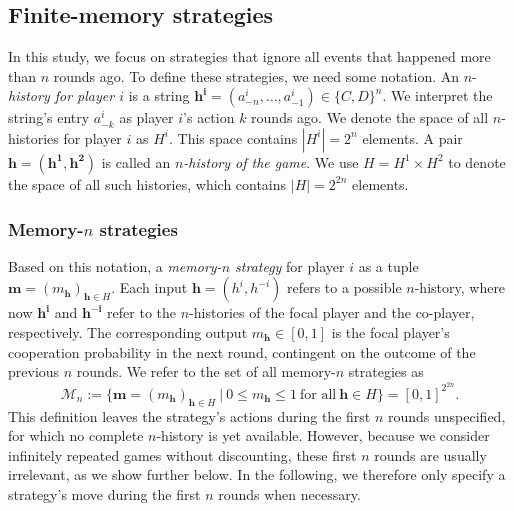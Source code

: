 \documentclass[9pt,twoside,lineno]{pnas-new}
\theoremstyle{plainCl1}
\theoremstyle{plainCl2}
\begin{document}
\subsection{Finite-memory strategies} 


In this study, we focus on strategies that ignore all events that happened more than $n$ rounds ago.
To define these strategies, we need some notation. 
An \(n\)-{\it history for player $i$} is a string \(\mathbf{h^i} \!=\! (a^i_{-n}, \ldots, a^i_{-1})\! \in \!\{C, D\}^n\). 
We interpret the string's entry \(a^i_{-k}\) as player \(i\)'s action \(k\) rounds ago. 
We denote the space of all \(n\)-histories for player \(i\) as \(H^i\). 
This space contains \(|H^i| \!=\! 2^n\) elements. 
A pair \(\mathbf{h} \!=\! (\mathbf{h^1}, \mathbf{h^2})\) is called an {\it \(n\)-history of the game}. 
We use \(H \!=\! H^1 \!\times\! H^2\) to denote the space of all such histories, which contains \(|H| \!=\! 2^{2n}\) elements.

\noindent
\subsubsection*{Memory-$n$ strategies} Based on this notation, a {\it memory-$n$ strategy}  for player $i$ as a tuple \(\mathbf{m} \!=\! (m_\mathbf{h})_{\mathbf{h}\in H}\). 
Each input $\mathbf{h}\!=\!(h^i,h^{-i})$ refers to a possible $n$-history, where now $\mathbf{h^i}$ and $\mathbf{h^{-i}}$ refer to the $n$-histories of the focal player and the co-player, respectively. 
The corresponding output $m_\mathbf{h}\!\in\![0,1]$ is the focal player's cooperation probability in the next round, contingent on  the outcome of the previous \(n\) rounds. We refer to the set of all memory-$n$ strategies as 
\begin{equation} \label{Eq:MemoryN}
\mathcal{M}_n:=\Big\{ \mathbf{m}\!=\!(m_\mathbf{h})_{\mathbf{h}\in H} ~\Big|~0\!\le\!m_\mathbf{h}\!\le\!1~\text{for all}~ \mathbf{h}\!\in\! H\Big\} = [0,1]^{2^{2n}} .
\end{equation}
This definition leaves the strategy's actions during the first $n$ rounds unspecified, for which no complete $n$-history is yet available. 
However, because we consider infinitely repeated games without discounting, these first $n$ rounds are usually irrelevant, as we show further below. 
In the following, we therefore only specify a strategy's move during the first $n$ rounds when necessary. 
\end{document}
